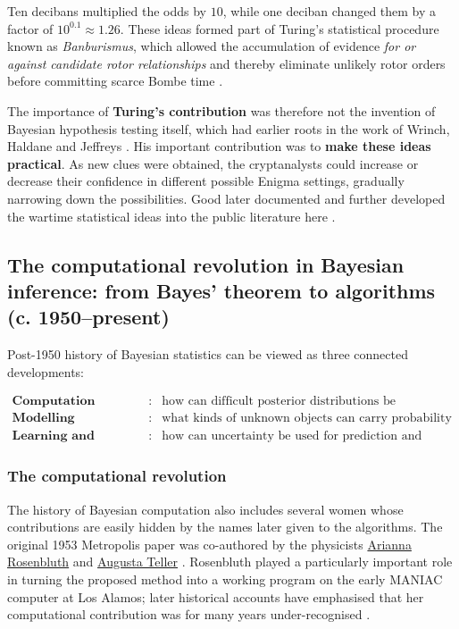 Ten decibans multiplied the odds by $10$, while one deciban changed them by a factor of $10^{0.1}\approx1.26$. These ideas formed part of Turing's statistical procedure known as \emph{Banburismus}, which allowed the accumulation of evidence \textit{for or against candidate rotor relationships} and thereby eliminate unlikely rotor orders before committing scarce Bombe time \cite{good1979turing,alexander1945,zabell2012turing}.

The importance of \textbf{Turing's contribution} was therefore not the invention of Bayesian hypothesis testing itself, which had earlier roots in the work of Wrinch, Haldane and Jeffreys
\cite{wrinchjeffreys1919,wrinchjeffreys1921,
wrinchjeffreys1923,haldane1932,jeffreys1935,
etzwagenmakers2017}. His important contribution was to \textbf{make these ideas practical}. As new clues were obtained, the cryptanalysts could increase or decrease their confidence in different possible Enigma settings, gradually narrowing down the possibilities. Good later documented and further developed the wartime statistical ideas into the public literature here \cite{good1950,good1979turing}.


\subsection{The computational revolution in Bayesian inference: from Bayes’ theorem to algorithms (c. 1950–present)}
\label{sec:bayes-computational-history}

Post-1950 history of Bayesian statistics can be viewed as three connected developments:

\[
\boxed{
\begin{array}{lll}
\textbf{Computation} &:&
\text{how can difficult posterior distributions be calculated?}\\[1mm]
\textbf{Modelling} &:&
\text{what kinds of unknown objects can carry probability distributions?}\\[1mm]
\textbf{Learning and decisions} &:&
\text{how can uncertainty be used for prediction and action?}
\end{array}}
\]


\subsubsection{The computational revolution}

The history of Bayesian computation also includes several women whose contributions are easily hidden by the names later given to the algorithms. The original 1953 Metropolis paper was co-authored by the physicists \href{https://en.wikipedia.org/wiki/Arianna_W._Rosenbluth}{Arianna Rosenbluth} and \href{https://en.wikipedia.org/wiki/Augusta_H._Teller}{Augusta Teller} \cite{metropolis1953}. Rosenbluth played a particularly important role in turning the proposed method into a working program on the early MANIAC computer at Los Alamos; later historical accounts have emphasised that her computational contribution was for many years under-recognised \cite{gubernatis2005}. 

